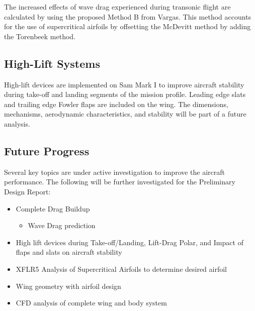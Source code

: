 The increased effects of wave drag experienced during transonic flight are calculated by using the proposed Method B from Vargas.  This method accounts for the use of supercritical airfoils by offsetting the McDevitt method by adding the Torenbeek method.


\subsection{High-Lift Systems}
High-lift devices are implemented on Sam Mark I to improve aircraft stability during take-off and landing segments of the mission profile.  Leading edge slats and trailing edge Fowler flaps are included on the wing.  The dimensions, mechanisms, aerodynamic characteristics, and stability will be part of a future analysis.

\subsection{Future Progress}
Several key topics are under active investigation to improve the aircraft performance. The following will be further investigated for the Preliminary Design Report:
\begin{itemize}
    \item Complete Drag Buildup
    \begin{itemize}
        \item Wave Drag prediction
    \end{itemize}
    \item High lift devices during Take-off/Landing, Lift-Drag Polar, and Impact of flaps and slats on aircraft stability
    \item XFLR5 Analysis of Supercritical Airfoils to determine desired airfoil
    \item Wing geometry with airfoil design
    \item CFD analysis of complete wing and body system
\end{itemize}


